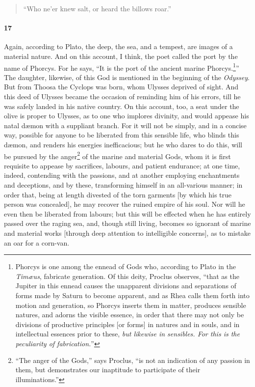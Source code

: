 \documentclass[a4paper,12pt]{article}
\begin{document}
\begin{verse}
``Who ne'er knew salt, or heard the billows roar.''
\end{verse}


\paragraph{17} Again, according to Plato, the deep, the sea, and a tempest, are
images of a material nature. And on this account, I think, the poet called the
port by the name of Phorcys. For he says, ``It is the port of the ancient
marine Phorcys.\footnote{Phorcys is one among the ennead of Gods who, according
to Plato in the \textit{Tim{\ae}us}, fabricate generation. Of this deity,
Proclus observes, ``that as the Jupiter in this ennead causes the unapparent
divisions and separations of forms made by Saturn to become apparent, and as
Rhea calls them forth into motion and generation, so Phorcys inserts them in
matter, produces sensible natures, and adorns the visible essence, in order
that there may not only be divisions of productive principles [or forms] in
natures and in souls, and in intellectual essences prior to these, \textit{but
likewise in sensibles. For this is the peculiarity of fabrication.}''}'' The
daughter, likewise, of this God is mentioned in the beginning of the
\textit{Odyssey}.  But from Thoosa the Cyclops was born, whom Ulysses deprived
of sight. And this deed of Ulysses became the occasion of reminding him of his
errors, till he was safely landed in his native country. On this account, too,
a seat under the olive is proper to Ulysses, as to one who implores divinity,
and would appease his natal d{\ae}mon with a suppliant branch. For it will not
be simply, and in a concise way, possible for anyone to be liberated from this
sensible life, who blinds this d{\ae}mon, and renders his energies
inefficacious; but he who dares to do this, will be pursued by the
anger\footnote{\-``The anger of the Gods,'' says Proclus, ``is not an
indication of any passion in them, but demonstrates our inaptitude to
participate of their illuminations.''} of the marine and material Gods, whom it
is first requisite to appease by sacrifices, labours, and patient endurance; at
one time, indeed, contending with the passions, and at another employing
enchantments and deceptions, and by these, transforming himself in an
all-various manner; in order that, being at length divested of the torn
garments [by which his true person was concealed], he may recover the ruined
empire of his soul. Nor will he even then be liberated from labours; but this
will be effected when he has entirely passed over the raging sea, and, though
still living, becomes so ignorant of marine and material works [through deep
attention to intelligible concerns], as to mistake an oar for a corn-van.
\end{document}

